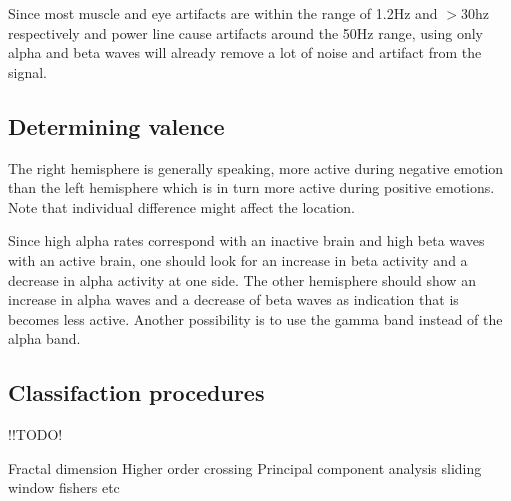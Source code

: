 \npar

Since most muscle and eye artifacts are within the range of 1.2Hz and $>$30hz respectively and power line cause artifacts around the 50Hz range, using only alpha and beta waves will already remove a lot of noise and artifact from the signal\cite{ExtendedPaper}.

\subsection{Determining valence}
The right hemisphere is generally speaking, more active during negative emotion than the left hemisphere which is in turn more active during positive emotions\cite{RealTimeEEGEmotion}\cite{EEGDatasets}. Note that individual difference might affect the location\cite{ExtendedPaper}.

\npar

Since high alpha rates correspond with an inactive brain and high beta waves with an active brain, one should look for an increase in beta activity and a decrease in alpha activity at one side. The other hemisphere should show an increase in alpha waves and a decrease of beta waves as indication that is becomes less active. Another possibility is to use the gamma band instead of the alpha band. 

\subsection{Classifaction procedures}
!!TODO!

Fractal dimension %
Higher order crossing
Principal component analysis
sliding window
fishers
etc


